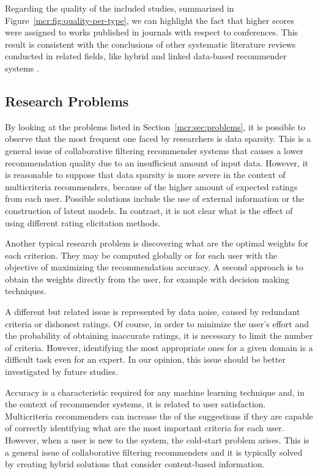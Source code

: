 Regarding the quality of the included studies, summarized in Figure~\ref{mcr:fig:quality-per-type}, we can highlight the fact that higher scores were assigned to works published in journals with respect to conferences. This result is consistent with the conclusions of other systematic literature reviews conducted in related fields, like hybrid and linked data-based recommender systems \cite{Cano2017,Figueroa2015}.

\subsection{Research Problems}

By looking at the problems listed in Section~\ref{mcr:sec:problems}, it is possible to observe that the most frequent one faced by researchers is data sparsity. This is a general issue of collaborative filtering recommender systems that causes a lower recommendation quality due to an insufficient amount of input data. However, it is reasonable to suppose that data sparsity is more severe in the context of multicriteria recommenders, because of the higher amount of expected ratings from each user. Possible solutions include the use of external information or the construction of latent models. In contrast, it is not clear what is the effect of using different rating elicitation methods.

Another typical research problem is discovering what are the optimal weights for each criterion. They may be computed globally or for each user with the objective of maximizing the recommendation accuracy. A second approach is to obtain the weights directly from the user, for example with decision making techniques.

A different but related issue is represented by data noise, caused by redundant criteria or dishonest ratings. Of course, in order to minimize the user's effort and the probability of obtaining inaccurate ratings, it is necessary to limit the number of criteria. However, identifying the most appropriate ones for a given domain is a difficult task even for an expert. In our opinion, this issue should be better investigated by future studies.

Accuracy is a characteristic required for any machine learning technique and, in the context of recommender systems, it is related to user satisfaction. Multicriteria recommenders can increase the  of the suggestions if they are capable of correctly identifying what are the most important criteria for each user. However, when a user is new to the system, the cold-start problem arises. This is a general issue of collaborative filtering recommenders and it is typically solved by creating hybrid solutions that consider content-based information.

